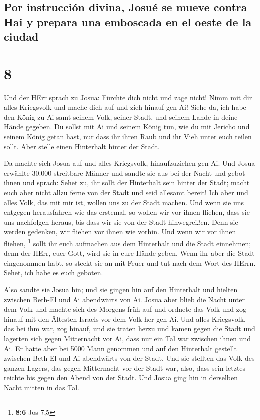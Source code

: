 \hypertarget{por-instrucciuxf3n-divina-josuuxe9-se-mueve-contra-hai-y-prepara-una-emboscada-en-el-oeste-de-la-ciudad}{%
\subsection{Por instrucción divina, Josué se mueve contra Hai y prepara
una emboscada en el oeste de la
ciudad}\label{por-instrucciuxf3n-divina-josuuxe9-se-mueve-contra-hai-y-prepara-una-emboscada-en-el-oeste-de-la-ciudad}}

\hypertarget{section-7}{%
\section{8}\label{section-7}}

 Und der HErr sprach zu Josua: Fürchte dich nicht und zage
nicht! Nimm mit dir alles Kriegsvolk und mache dich auf und zieh hinauf
gen Ai! Siehe da, ich habe den König zu Ai samt seinem Volk, seiner
Stadt, und seinem Lande in deine Hände gegeben.  Du sollst
mit Ai und seinem König tun, wie du mit Jericho und seinem König getan
hast, nur dass ihr ihren Raub und ihr Vieh unter euch teilen sollt. Aber
stelle einen Hinterhalt hinter der Stadt.

 Da machte sich Josua auf und alles Kriegsvolk,
hinaufzuziehen gen Ai. Und Josua erwählte 30.000 streitbare Männer und
sandte sie aus bei der Nacht  und gebot ihnen und sprach:
Sehet zu, ihr sollt der Hinterhalt sein hinter der Stadt; macht euch
aber nicht allzu ferne von der Stadt und seid allesamt bereit!
 Ich aber und alles Volk, das mit mir ist, wollen uns zu
der Stadt machen. Und wenn sie uns entgegen herausfahren wie das
erstemal, so wollen wir vor ihnen fliehen,  dass sie uns
nachfolgen heraus, bis dass wir sie von der Stadt hinwegreißen. Denn sie
werden gedenken, wir fliehen vor ihnen wie vorhin. Und wenn wir vor
ihnen fliehen, \footnote{\textbf{8:6} Jos 7,5}  sollt ihr
euch aufmachen aus dem Hinterhalt und die Stadt einnehmen; denn der
HErr, euer Gott, wird sie in eure Hände geben.  Wenn ihr
aber die Stadt eingenommen habt, so steckt sie an mit Feuer und tut nach
dem Wort des HErrn. Sehet, ich habe es euch geboten.

 Also sandte sie Josua hin; und sie gingen hin auf den
Hinterhalt und hielten zwischen Beth-El und Ai abendwärts von Ai. Josua
aber blieb die Nacht unter dem Volk  und machte sich des
Morgens früh auf und ordnete das Volk und zog hinauf mit den Ältesten
Israels vor dem Volk her gen Ai.  Und alles Kriegsvolk,
das bei ihm war, zog hinauf, und sie traten herzu und kamen gegen die
Stadt und lagerten sich gegen Mitternacht vor Ai, dass nur ein Tal war
zwischen ihnen und Ai.  Er hatte aber bei 5000 Mann
genommen und auf den Hinterhalt gestellt zwischen Beth-El und Ai
abendwärts von der Stadt.  Und sie stellten das Volk des
ganzen Lagers, das gegen Mitternacht vor der Stadt war, also, dass sein
letztes reichte bis gegen den Abend von der Stadt. Und Josua ging hin in
derselben Nacht mitten in das Tal.

